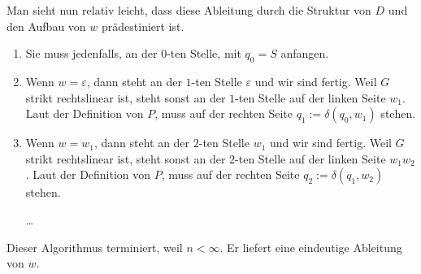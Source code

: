 \begin{solution}
Man sieht nun relativ leicht, dass diese Ableitung durch die Struktur von $D$ und den Aufbau von $w$ prädestiniert ist.

\begin{enumerate}[label = \arabic*., start = 0]

    \item Sie muss jedenfalls, an der $0$-ten Stelle, mit $q_0 = S$ anfangen.

    \item Wenn $w = \varepsilon$, dann steht an der $1$-ten Stelle $\varepsilon$ und wir sind fertig.
    Weil $G$ strikt rechtslinear ist, steht sonst an der $1$-ten Stelle auf der linken Seite $w_1$.
    Laut der Definition von $P$, muss auf der rechten Seite $q_1 := \delta(q_0, w_1)$ stehen.
    
    \item Wenn $w = w_1$, dann steht an der $2$-ten Stelle $w_1$ und wir sind fertig.
    Weil $G$ strikt rechtslinear ist, steht sonst an der $2$-ten Stelle auf der linken Seite $w_1 w_2$.
    Laut der Definition von $P$, muss auf der rechten Seite $q_2 := \delta(q_1, w_2)$ stehen.

    \item [\dots]

\end{enumerate}

Dieser Algorithmus terminiert, weil $n < \infty$.
Er liefert eine eindeutige Ableitung von $w$.

\end{solution}

